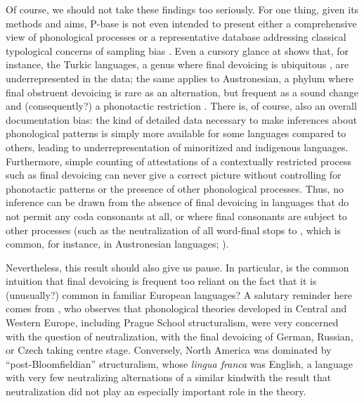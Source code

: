 \documentclass[output=paper,colorlinks,citecolor=brown]{langscibook}
\begin{document}
Of course, we should not take these findings too seriously. For one thing, given its  methods and aims, P-base is not even intended to present either a comprehensive view of phonological processes or a representative database addressing classical typological concerns of sampling bias \parencite[47--48]{mielke-diss}. Even a cursory glance at  shows that, for instance, the Turkic languages, a genus where final devoicing is ubiquitous \parencite[27--28]{johanson2021structure}, are underrepresented in the data; the same applies to Austronesian, a phylum where final obstruent devoicing is rare as an alternation, but frequent as a sound change and (consequently?) a phonotactic restriction \parencite[\ppno~220--222, 246--247]{blust2013austronesian}. There is, of course, also an overall documentation bias: the kind of detailed data necessary to make inferences about  phonological patterns is simply more available for some languages compared to others, leading to underrepresentation of minoritized and indigenous languages. Furthermore, simple counting of attestations of a contextually restricted process such as final devoicing can never give a correct picture without controlling for phonotactic patterns or the presence of other phonological processes. Thus, no inference can be drawn from the absence of final devoicing in languages that do not permit any coda consonants at all, or where final consonants are subject to other processes (such as the neutralization of all word-final stops to \ipa{[ʔ]}, which is common, for instance, in Austronesian languages; \citealt[246--247]{blust2013austronesian}).

Nevertheless, this result should also give us pause. In particular, is the common intuition that final devoicing is frequent too reliant on the fact that it is (unusually?) common in familiar European languages? A salutary reminder here comes from \textcite{ladd2022mid}, who observes that phonological theories developed in Central and Western Europe, including Prague School structuralism, were very concerned with the question of neutralization, with the final devoicing of German, Russian, or Czech taking centre stage. Conversely, North America was dominated by \enquote{post\hyp Bloomfieldian} structuralism, whose \textit{lingua franca} was English, a language with very few neutralizing alternations of a similar kind\dash with the result that neutralization did not play an especially important role in the theory.
\end{document}
